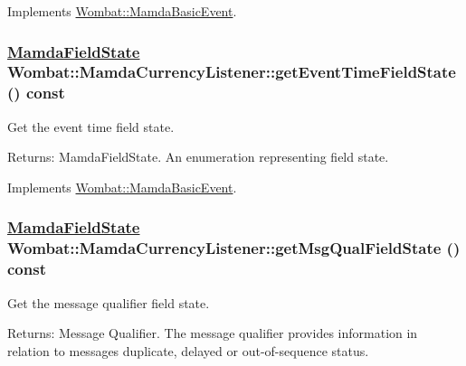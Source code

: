 Implements \hyperlink{classWombat_1_1MamdaBasicEvent_51cc0b9d4c2b8a982ccd18b339707cb5}{Wombat::Mamda\-Basic\-Event}.\hypertarget{classWombat_1_1MamdaCurrencyListener_88df072f42678a7b2bb71e6c88e97dac}{
\subsubsection[getEventTimeFieldState]{\setlength{\rightskip}{0pt plus 5cm}\hyperlink{namespaceWombat_93aac974f2ab713554fd12a1fa3b7d2a}{Mamda\-Field\-State} Wombat::Mamda\-Currency\-Listener::get\-Event\-Time\-Field\-State () const}}
\label{classWombat_1_1MamdaCurrencyListener_88df072f42678a7b2bb71e6c88e97dac}


Get the event time field state. 

\begin{Desc}
\item[Returns:]Mamda\-Field\-State. An enumeration representing field state. \end{Desc}


Implements \hyperlink{classWombat_1_1MamdaBasicEvent_ff3932065e16e660fb6cd9285b46f7d0}{Wombat::Mamda\-Basic\-Event}.\hypertarget{classWombat_1_1MamdaCurrencyListener_36f04bd57be711459aedc2857be8b621}{
\subsubsection[getMsgQualFieldState]{\setlength{\rightskip}{0pt plus 5cm}\hyperlink{namespaceWombat_93aac974f2ab713554fd12a1fa3b7d2a}{Mamda\-Field\-State} Wombat::Mamda\-Currency\-Listener::get\-Msg\-Qual\-Field\-State () const}}
\label{classWombat_1_1MamdaCurrencyListener_36f04bd57be711459aedc2857be8b621}


Get the message qualifier field state. 

\begin{Desc}
\item[Returns:]Message Qualifier. The message qualifier provides information in relation to messages duplicate, delayed or out-of-sequence status. \end{Desc}


